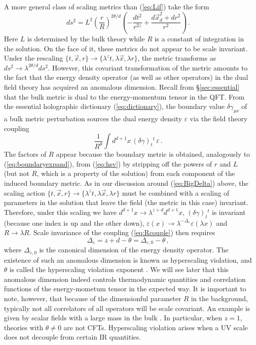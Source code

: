 \documentclass[10pt, oneside]{book}
\def\be{\begin{equation}}
\def\ee{\end{equation}}
\def\vep{{\varepsilon}}
\begin{document}
\begin{doublespace}
A more general class of scaling metrics than (\ref{eq:Lif}) take the form
\be\label{eq:hsv}
ds^2 = L^2 \left(\frac{r}{R}\right)^{2\theta/d} \left(- \frac{dt^2}{r^{2z}} + \frac{d\vec x^2_{d} + dr^2}{r^2} \right) \,.
\ee
Here $L$ is determined by the bulk theory while $R$ is a constant of integration in the solution.
On the face of it, these metrics do not appear to be scale invariant. Under the rescaling
$\{t, \vec x, r \} \to \{\lambda^z t , \lambda \vec x, \lambda r \}$, the metric transforms as $ds^2 \to \lambda^{2 \theta/d} ds^2$.
However, this covariant transformation of the metric amounts to the fact that the energy density operator (as well as other operators) in the dual field theory
has acquired an anomalous dimension. Recall from \S\ref{sec:essential} that the bulk metric is dual to the energy-momentum tensor in the QFT. From the essential holographic dictionary (\ref{eq:dictionary}), the boundary value $\delta \gamma_{\mu\nu}$ of a
bulk metric perturbation sources the dual energy density $\vep$ via the field theory
coupling
\be\label{eq:Rcouple}
\frac{1}{R^\theta} \int d^{d+1}x \, (\delta \gamma)_t{}^t  \, \vep \,.
\ee
The factors of $R$ appear because the boundary metric is obtained, analogously to (\ref{eq:boundaryexpand}), from (\ref{eq:hsv}) by stripping off the powers of $r$ and $L$ (but not $R$, which is a property of the solution) from each component of the induced boundary metric. As in our discussion around (\ref{eq:BigDelta}) above, the scaling action $\{t, \vec x, r \} \to \{\lambda^z t , \lambda \vec x, \lambda r \}$ must be combined with a scaling of parameters in the solution that leave the field (the metric in this case) invariant. Therefore, under this scaling we have $d^{d+1}x \to \lambda^{z+d} d^{d+1}x$,
$(\delta \gamma)_t{}^t$ is invariant (because one index is up and the other down), $\vep(x) \to \lambda^{-\Delta_\vep} \vep(\lambda x)$
and $R \to  \lambda R$. Scale invariance of the coupling (\ref{eq:Rcouple}) then requires
\be
\Delta_\vep = z + d  - \theta = \Delta_{\vep,0} - \theta \,,
\ee
where $\Delta_{\vep,0}$ is the canonical dimension of the energy density operator. The existence of such an anomalous dimension is known as hyperscaling violation, and $\theta$ is called the hyperscaling violation exponent \cite{Huijse:2011ef}. We will see later that this anomalous dimension indeed controls thermodynamic quantities and correlation functions of the energy-mometum tensor in the expected way. It is important to note, however, that because of the dimensionful parameter $R$ in the background, typically not all correlators of all operators will be scale covariant. An example is given by scalar fields with a large mass in the bulk \cite{Dong:2012se}. In particular, when $z=1$, theories with $\theta \neq 0$ are not CFTs. Hyperscaling violation arises when a UV scale does not decouple from certain IR quantities.


\end{doublespace}
\end{document}
